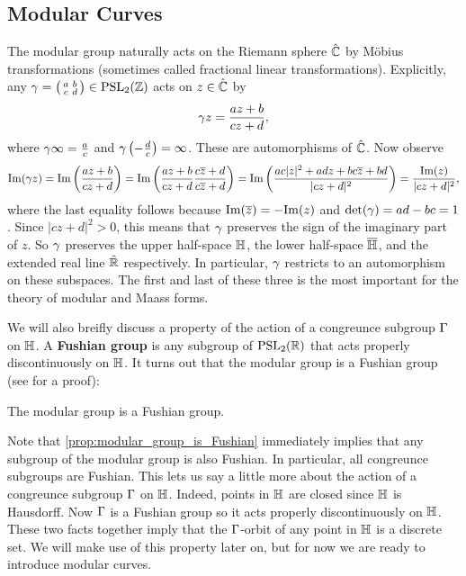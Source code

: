    \subsection*{Modular Curves}
      The modular group naturally acts on the Riemann sphere $\hat{\mathbb{C}}$ by M\"obius transformations (sometimes called fractional linear transformations). Explicitly, any $\gamma = \begin{psmallmatrix} a & b \\ c & d \end{psmallmatrix} \in \mathrm{PSL}_{2}(\mathbb{Z})$ acts on $z \in \hat{\mathbb{C}}$ by
      \[
        \gamma z = \frac{az+b}{cz+d},
      \]
      where $\gamma \infty = \frac{a}{c}$ and $\gamma\left(-\frac{d}{c}\right) = \infty$. These are automorphisms of $\hat{\mathbb{C}}$. Now observe
      \[
        \mathrm{Im}(\gamma z) = \mathrm{Im}\left(\frac{az+b}{cz+d}\right) = \mathrm{Im}\left(\frac{az+b}{cz+d}\frac{c\overline{z}+d}{c\overline{z}+d}\right) = \mathrm{Im}\left(\frac{ac|z|^{2}+adz+bc\overline{z}+bd}{|cz+d|^{2}}\right) = \frac{\mathrm{Im}(z)}{|cz+d|^{2}},
      \]
      where the last equality follows because $\mathrm{Im}(\overline{z}) = -\mathrm{Im}(z)$ and $\det(\gamma) = ad-bc = 1$. Since $|cz+d|^{2} > 0$, this means that $\gamma$ preserves the sign of the imaginary part of $z$. So $\gamma$ preserves the upper half-space $\mathbb{H}$, the lower half-space $\overline{\mathbb{H}}$, and the extended real line $\hat{\mathbb{R}}$ respectively. In particular, $\gamma$ restricts to an automorphism on these subspaces. The first and last of these three is the most important for the theory of modular and Maass forms.

      We will also breifly discuss a property of the action of a congreunce subgroup $\Gamma$ on $\mathbb{H}$. A \textbf{Fushian group} is any subgroup of $\mathrm{PSL}_{2}(\mathbb{R})$ that acts properly discontinuously on $\mathbb{H}$. It turns out that the modular group is a Fushian group (see \cite{diamond2005first} for a proof):

      \begin{proposition}\label{prop:modular_group_is_Fushian}
        The modular group is a Fushian group.
      \end{proposition}

      Note that \cref{prop:modular_group_is_Fushian} immediately implies that any subgroup of the modular group is also Fushian. In particular, all congreunce subgroups are Fushian. This lets us say a little more about the action of a congreunce subgroup $\Gamma$ on $\mathbb{H}$. Indeed, points in $\mathbb{H}$ are closed since $\mathbb{H}$ is Hausdorff. Now $\Gamma$ is a Fushian group so it acts properly discontinuously on $\mathbb{H}$. These two facts together imply that the $\Gamma$-orbit of any point in $\mathbb{H}$ is a discrete set. We will make use of this property later on, but for now we are ready to introduce modular curves.

